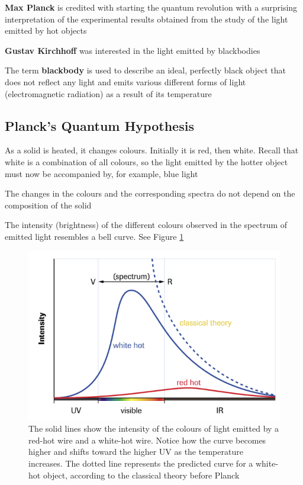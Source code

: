 \begin{bulleted-list}
    \item \textbf{Max Planck} is credited with starting the quantum revolution with a surprising interpretation
        of the experimental results obtained from the study of the light emitted by hot objects
    \item \textbf{Gustav Kirchhoff} was interested in the light emitted by blackbodies
    \item The term \textbf{blackbody} is used to describe an ideal, perfectly black object that
        does not reflect any light and emits various different forms of light (electromagnetic
        radiation) as a result of its temperature
\end{bulleted-list}

\subsection{Planck's Quantum Hypothesis}
\begin{bulleted-list}
    \item As a solid is heated, it changes colours. Initially it is red, then white. Recall
        that white is a combination of all colours, so the light emitted by the hotter
        object must now be accompanied by, for example, blue light
    \item The changes in the colours and the corresponding spectra do not depend on the composition
        of the solid
    \item The intensity (brightness) of the different colours observed in the spectrum of emitted
        light resembles a bell curve. See Figure \ref{fig:intensity-wavelength-graph}
\end{bulleted-list}

\begin{figure}[ht!]
    \centering
    \includegraphics[width=0.7 \textwidth]{../figures/intensity-wavelength-graph.png}
    \caption{The solid lines show the intensity of the colours of light emitted by a red-hot
        wire and a white-hot wire. Notice how the curve becomes higher and shifts toward the
        higher UV as the temperature increases. The dotted line represents the predicted curve
        for a white-hot object, according to the classical theory before Planck}
    \label{fig:intensity-wavelength-graph}
\end{figure}


